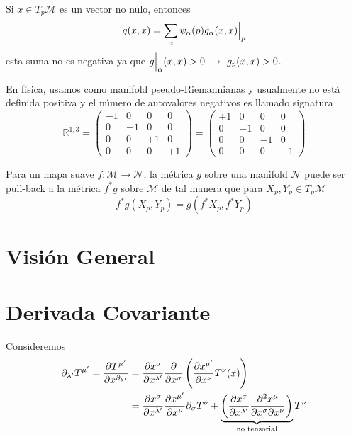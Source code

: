 \documentclass[../main]{subfiles}
\begin{document}
Si $x \in T_p\mathcal{M}$ es un vector no nulo, entonces
\begin{equation}
    g(x, x)=\sum_{\alpha} \psi_{\alpha}(p) g_{\alpha}(x, x)\Big{|}_p
\end{equation}
esta suma no es negativa ya que $g\Big{|}_{\alpha}(x, x)>0 \ \rightarrow \ g_p(x, x)>0$.

En física, usamos como manifold pseudo-Riemannianas y usualmente no está definida positiva y el número de autovalores negativos es llamado signatura
\begin{equation}
    \mathbb{R}^{1, 3}=
    \begin{pmatrix}
        -1 & 0 & 0 & 0 \\
        0 & +1 & 0 & 0 \\
        0 & 0 & +1 & 0 \\
        0 & 0 & 0 & +1 
    \end{pmatrix}
    =
    \begin{pmatrix}
        +1 & 0 & 0 & 0 \\
        0 & -1 & 0 & 0 \\
        0 & 0 & -1 & 0 \\
        0 & 0 & 0 & -1 
    \end{pmatrix}
\end{equation}

Para un mapa suave $f:\mathcal{M}\rightarrow \mathcal{N}$, la métrica $g$ sobre una manifold $\mathcal{N}$ puede ser pull-back a la métrica $f^* g$ sobre $\mathcal{M}$ de tal manera que para $X_p, Y_p \in T_p \mathcal{M}$
\begin{equation}
    f^* g(X_p, Y_p)=g(f^* X_p, f^* Y_p)
\end{equation}

\section{Visión General}

\section{Derivada Covariante}
Consideremos 
\begin{equation}
    \begin{split}
        \partial_{\lambda'}T^{\mu'}=\pdv{T^{\mu'}}{x^{\partial_{\lambda'}}}&=\pdv{x^{\sigma}}{x^{\lambda'}}\pdv{}{x^{\sigma}}\left(\pdv{x^{\mu'}}{x^{\nu}}T^{\nu}(x)\right)\\
        &=\pdv{x^{\sigma}}{x^{\lambda'}}\pdv{x^{\mu'}}{x^{\nu}}\partial_{\sigma} T^{\nu}+\underbrace{\left(\pdv{x^{\sigma}}{x^{\lambda'}}\pdv{^2 x^{\mu}}{x^{\sigma}\partial x^{\nu}}\right)}_{\text{no tensorial}} T^{\nu}
    \end{split}
\end{equation}
\end{document}

